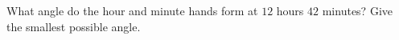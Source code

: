 What angle do the hour and minute hands form at $12$ hours $42$ minutes? Give the smallest possible angle.
